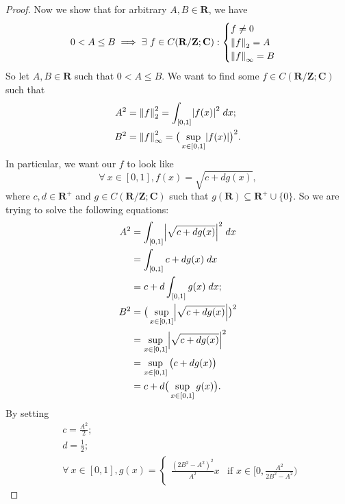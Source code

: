 \begin{proof}
    Now we show that for arbitrary \(A, B \in \mathbf{R}\), we have
    \[
        0 < A \leq B \implies \exists\ f \in C(\mathbf{R} / \mathbf{Z} ; \mathbf{C}) : \begin{cases}
            f \neq 0        \\
            \norm*{f}_2 = A \\
            \norm*{f}_{\infty} = B
        \end{cases}
    \]
    So let \(A, B \in \mathbf{R}\) such that \(0 < A \leq B\).
    We want to find some \(f \in C(\mathbf{R} / \mathbf{Z} ; \mathbf{C})\) such that
    \begin{align*}
        A^2 & = \norm*{f}_2^2 = \int_{[0, 1]} \abs*{f(x)}^2 \; dx;                  \\
        B^2 & = \norm*{f}_{\infty}^2 = \big(\sup_{x \in [0, 1]} \abs*{f(x)}\big)^2.
    \end{align*}
    In particular, we want our \(f\) to look like
    \[
        \forall\ x \in [0, 1], f(x) = \sqrt{c + d g(x)},
    \]
    where \(c, d \in \mathbf{R}^+\) and \(g \in C(\mathbf{R} / \mathbf{Z} ; \mathbf{C})\) such that \(g(\mathbf{R}) \subseteq \mathbf{R}^+ \cup \{0\}\).
    So we are trying to solve the following equations:
    \begin{align*}
        A^2 & = \int_{[0, 1]} \abs*{\sqrt{c + dg(x)}}^2 \; dx           \\
            & = \int_{[0, 1]} c + dg(x) \; dx                           \\
            & = c + d \int_{[0, 1]} g(x) \; dx;                         \\
        B^2 & = \big(\sup_{x \in [0, 1]} \abs*{\sqrt{c + dg(x)}}\big)^2 \\
            & = \sup_{x \in [0, 1]} \abs*{\sqrt{c + dg(x)}}^2           \\
            & = \sup_{x \in [0, 1]} \big(c + dg(x)\big)                 \\
            & = c + d \big(\sup_{x \in [0, 1]} g(x)\big).
    \end{align*}
    By setting
    \begin{align*}
         & c = \frac{A^2}{2};                                        \\
         & d = \frac{1}{2};                                          \\
         & \forall\ x \in [0, 1], g(x) = \begin{cases}
            \frac{(2 B^2 - A^2)^2}{A^2} x                    & \text{if } x \in [0, \frac{A^2}{2 B^2 - A^2})                         \\

\end{cases}
\end{align*}
\end{proof}
